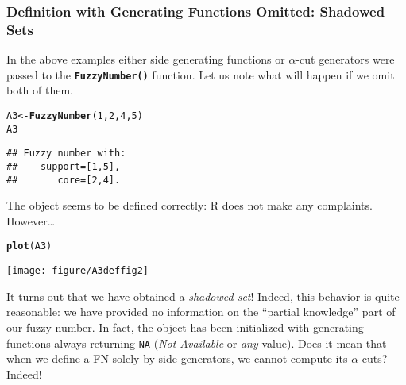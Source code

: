 \documentclass[11pt]{article}\usepackage[]{graphicx}\usepackage[]{color}
\makeatletter
\newcommand{\hlnum}[1]{\textcolor[rgb]{0.686,0.059,0.569}{#1}}%
\newcommand{\hlstd}[1]{\textcolor[rgb]{0.345,0.345,0.345}{#1}}%
\newcommand{\hlkwb}[1]{\textcolor[rgb]{0.69,0.353,0.396}{#1}}%
\newcommand{\hlkwd}[1]{\textcolor[rgb]{0.737,0.353,0.396}{\textbf{#1}}}%
\newenvironment{kframe}{%
 \def\at@end@of@kframe{}%
 \ifinner\ifhmode%
  \def\at@end@of@kframe{\end{minipage}}%
  \begin{minipage}{\columnwidth}%
 \fi\fi%
 \def\FrameCommand##1{\hskip\@totalleftmargin \hskip-\fboxsep
 \colorbox{shadecolor}{##1}\hskip-\fboxsep
     \hskip-\linewidth \hskip-\@totalleftmargin \hskip\columnwidth}%
 \MakeFramed {\advance\hsize-\width
   \@totalleftmargin\z@ \linewidth\hsize
   \@setminipage}}%
 {\par\unskip\endMakeFramed%
 \at@end@of@kframe}
\newenvironment{knitrout}{}{} %
\newcommand{\lang}[1]{\textsf{#1}\xspace}
\newcommand{\R}{\lang{R}}
\newcommand{\func}[1]{\texttt{\hlkwd{#1}}}
\makeatother
\begin{document}
\subsubsection{Definition with Generating Functions Omitted: Shadowed Sets}

In the above examples
either side generating functions or $\alpha$-cut generators
were passed to the \func{FuzzyNumber()} function.
Let us note what will happen if we omit both of them.

\begin{knitrout}\small
{}\color{fgcolor}\begin{kframe}
\begin{alltt}
\hlstd{A3} \hlkwb{<-} \hlkwd{FuzzyNumber}\hlstd{(}\hlnum{1}\hlstd{,} \hlnum{2}\hlstd{,} \hlnum{4}\hlstd{,} \hlnum{5}\hlstd{)}
\hlstd{A3}
\end{alltt}
\begin{verbatim}
## Fuzzy number with:
##    support=[1,5],
##       core=[2,4].
\end{verbatim}
\end{kframe}
\end{knitrout}

\noindent
The object seems to be defined correctly: \R does not make any
complaints. However\dots

\begin{knitrout}\small
{}\color{fgcolor}\begin{kframe}
\begin{alltt}
\hlkwd{plot}\hlstd{(A3)}
\end{alltt}
\end{kframe}
\end{knitrout}

\begin{center}
\begin{knitrout}\small
{}\color{fgcolor}

{\centering \texttt{[image: figure/A3deffig2]} 

}



\end{knitrout}
\end{center}

\noindent
It turns out that we have obtained a \textit{shadowed set}!
Indeed, this behavior is quite reasonable: we have provided no information
on the ``partial knowledge'' part of our fuzzy number.
In fact, the object has been initialized
with generating functions always returning \texttt{NA}
(\textit{Not-Available} or \textit{any} value).
Does it mean that when we define a FN solely by side generators, we
cannot compute its $\alpha$-cuts? Indeed!
\end{document}
